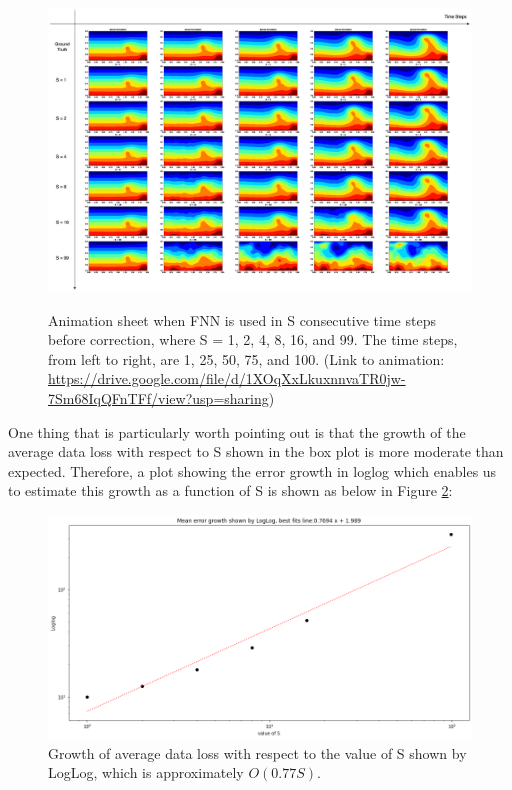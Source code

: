 \begin{figure}[H]
    \centering
    \caption{Animation sheet when FNN is used in S consecutive time steps before correction, where S = 1, 2, 4, 8, 16, and 99. The time steps, from left to right, are 1, 25, 50, 75, and 100. (Link to animation: \url{https://drive.google.com/file/d/1XOqXxLkuxnnvaTR0jw-7Sm68IqQFnTFf/view?usp=sharing})}
    \includegraphics[scale=0.30]{figures/mantle_convection_images/further_testings/FNN_further_testing_sheet.png}
    \label{figure:further_GIF}
\end{figure}

One thing that is particularly worth pointing out is that the growth of the average data loss with respect to S shown in the box plot is more moderate than expected. Therefore, a plot showing the error growth in loglog which enables us to estimate this growth as a function of S is shown as below in Figure \ref{figure:further_loglog}:

\begin{figure}[H]
    \centering
    \includegraphics[scale=0.4]{figures/mantle_convection_images/further_testings/FNN_LogLog.png}
    \caption{Growth of average data loss with respect to the value of S shown by LogLog, which is approximately $O(0.77S)$.}
    \label{figure:further_loglog}
\end{figure}


